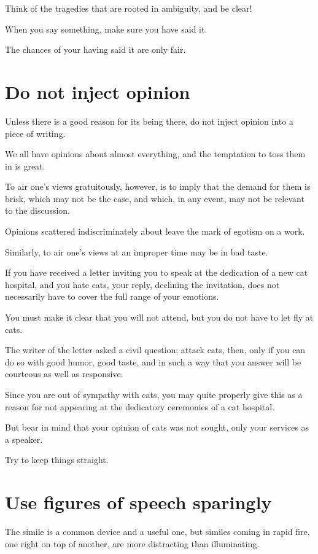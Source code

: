 \documentclass{book}
\numberwithin{equation}{section}
\begin{document}
Think of the tragedies that are rooted in ambiguity, and be clear!

When you say something, make sure you have said it.

The chances of your having said it are only fair.

\section{Do not inject opinion}
Unless there is a good reason for its being there, do not inject opinion into a piece of writing.

We all have opinions about almost everything, and the temptation to toss them in is great.

To air one's views gratuitously, however, is to imply that the demand for them is brisk, which may not be the case, and which, in any event, may not be relevant to the discussion.

Opinions scattered indiscriminately about leave the mark of egotism on a work.

Similarly, to air one's views at an improper time may be in bad taste.

If you have received a letter inviting you to speak at the dedication of a new cat hospital, and you hate cats, your reply, declining the invitation, does not necessarily have to cover the full range of your emotions.

You must make it clear that you will not attend, but you do not have to let fly at cats.

The writer of the letter asked a civil question; attack cats, then, only if you can do so with good humor, good taste, and in such a way that you answer will be courteous as well as responsive.

Since you are out of sympathy with cats, you may quite properly give this as a reason for not appearing at the dedicatory ceremonies of a cat hospital.

But bear in mind that your opinion of cats was not sought, only your services as a speaker.

Try to keep things straight.

\section{Use figures of speech sparingly}
The simile is a common device and a useful one, but similes coming in rapid fire, one right on top of another, are more distracting than illuminating.
\end{document}
